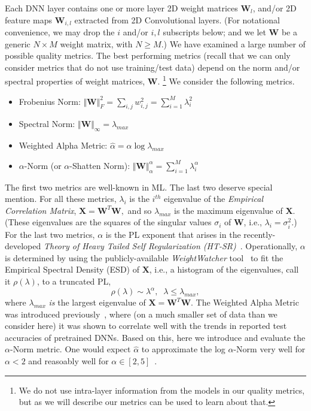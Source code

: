 Each DNN layer contains one or more layer 2D weight matrices $\mathbf{W}_{l}$, and/or 2D feature maps $\mathbf{W}_{i,l}$ extracted from 2D Convolutional layers. 
(For notational convenience, we may drop the $i$ and/or $i,l$ subscripts below; and we let $\mathbf{W}$ be a generic $N\times M$ weight matrix, with $N\ge M$.) 
%
We have examined a large number of possible quality metrics.
The best performing metrics (recall that we can only consider metrics that do not use training/test data) depend on the norm and/or spectral properties of weight matrices, $\mathbf{W}$.%
\footnote{We do not use intra-layer information from the models in our quality metrics, but as we will describe our metrics can be used to learn about that.}
We consider the following metrics.
\begin{itemize}
\item 
Frobenius Norm: $\Vert\mathbf{W}\Vert^{2}_{F}=\sum_{i,j}w^{2}_{i,j} = \sum_{i=1}^{M} \lambda_{i}^{2}$
\item 
Spectral Norm: $\Vert\mathbf{W}\Vert_{\infty}=\lambda_{max}$
\item 
Weighted Alpha Metric: $\hat{\alpha}=\alpha\log\lambda_{max}$
\item 
$\alpha$-Norm (or $\alpha$-Shatten Norm): $\Vert\mathbf{W}\Vert^{\alpha}_{\alpha}=\sum_{i=1}^{M}\lambda_{i}^{\alpha}$
\end{itemize}
The first two metrics are well-known in ML.
The last two deserve special mention.
For all these metrics, $\lambda_{i}$ is the $i^{th}$ eigenvalue of the \emph{Empirical Correlation Matrix},
$ %
\mathbf{X}=\mathbf{W}^{T}\mathbf{W} ,
$ %
and so $\lambda_{max}$ is the maximum eigenvalue of $\mathbf{X}$. 
(These eigenvalues are the squares of the singular values $\sigma_{i}$ of $\mathbf{W}$, i.e., $\lambda_{i}=\sigma^{2}_{i}$.)
For the last two metrics, $\alpha$ is the PL exponent that arises in the recently-developed \emph{Theory of Heavy Tailed Self Regularization (HT-SR)}~\cite{MM18_TR, MM19_HTSR_ICML, MM20_SDM}.
Operationally, $\alpha$ is determined by using the publicly-available \emph{WeightWatcher} tool~\cite{weightwatcher_package} to fit the Empirical Spectral Density (ESD) of $\mathbf{X}$, i.e., a histogram of the eigenvalues, call it $\rho(\lambda)$, to a truncated PL, 
\begin{equation}
\rho(\lambda)\sim\lambda^{\alpha},\;\;\lambda\le\lambda_{max}  ,
\end{equation}
where $\lambda_{max}$ \emph{is} the largest eigenvalue of $\mathbf{X}=\mathbf{W}^{T}\mathbf{W}$.
The Weighted Alpha Metric was introduced previously~\cite{MM20_SDM}, where (on a much smaller set of data than we consider here) it was shown to correlate well with the trends in reported test accuracies of pretrained DNNs.
Based on this, here we introduce and evaluate the $\alpha$-Norm metric.
One would expect $\hat{\alpha}$ to approximate the log $\alpha$-Norm very well for $\alpha < 2$ and reasoably well for $\alpha\in[2,5]$~\cite{MM20_unpub_work}.

